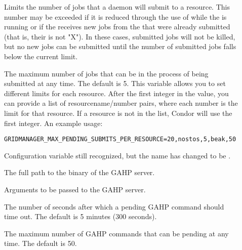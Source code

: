 \begin{description}
\item[]
\label{param:GridmanagerMaxSubmittedJobsPerResource}
Limits the number of jobs
that a  daemon will submit to a resource.
This number may be exceeded if it is reduced through the use
of  while the  is running
or if the  receives new
jobs from the  that were already submitted
(that is, their  is not "X").
In these cases, submitted jobs will not be killed,
but no new jobs can be submitted until the number of submitted
jobs falls below the current limit.

\item[]
\label{param:GridmanagerMaxPendingSubmitsPerResource} The maximum
number of jobs
that can be in the process of being submitted at any time. The default
is 5.
This variable allows
you to set different limits for each resource.
After the first integer in the value,
you can provide a list of resourcename/number pairs,
where each number is the limit for that resource.
If a resource is not in the list,
Condor will use the first integer.
An example usage:
\begin{verbatim}
GRIDMANAGER_MAX_PENDING_SUBMITS_PER_RESOURCE=20,nostos,5,beak,50
\end{verbatim}

\item[]
\label{param:GridmanagerMaxPendingSubmits} Configuration variable
still recognized, but the name has changed to be
.

\item[]
\label{param:Gahp} The full path to the binary of the GAHP server.

\item[]
\label{param:GahpArgs} Arguments to be passed to the GAHP server.

\item[]
\label{param:GridmanagerGahpCallTimeout} The number of seconds after
which a pending GAHP command should time out. The default is 5 minutes
(300 seconds).

\item[]
\label{param:GridmanagerMaxPendingRequests} The maximum number of GAHP
commands that can be pending at any time. The default is 50.


\end{description}
